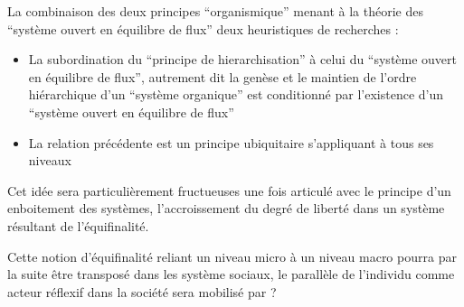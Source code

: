  

La combinaison des deux principes \enquote{organismique} menant à la théorie des \enquote{système ouvert en équilibre de flux} deux heuristiques de recherches \autocite[481]{Pouvreau2013}:
\begin{itemize}
\item La subordination du \enquote{principe de hierarchisation} à celui du \enquote{système ouvert en équilibre de flux}, autrement dit la genèse et le maintien de l’ordre hiérarchique d’un \enquote{système organique} est conditionné par l'existence d'un \enquote{système ouvert en équilibre de flux}
\item  La relation précédente est un principe ubiquitaire s’appliquant à tous ses niveaux
\end{itemize} 

Cet idée sera particulièrement fructueuses une fois articulé avec le principe d'un enboitement des systèmes, l'accroissement du degré de liberté dans un système résultant de l'équifinalité.
 \autocite[38]{Bertalanffy1973} \autocite[786-788]{Pouvreau2013}


Cette notion d'équifinalité reliant un niveau micro à un niveau macro pourra par la suite être transposé dans les système sociaux, le parallèle de l'individu comme acteur réflexif dans la société sera mobilisé par ?

